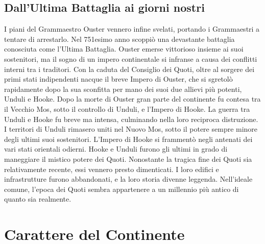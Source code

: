 \documentclass[a4paper]{report}
\begin{document}
\begin{multicols}{2}
\section*{Dall'Ultima Battaglia ai giorni nostri}
I piani del Grammaestro Ouster vennero infine svelati, portando i Grammaestri a tentare di arrestarlo. Nel 751esimo anno scoppiò una devastante battaglia conosciuta come l'Ultima Battaglia. Ouster emerse vittorioso insieme ai suoi sostenitori, ma il sogno di un impero continentale si infranse a causa dei conflitti interni tra i traditori.
Con la caduta del Consiglio dei Quoti, oltre al sorgere dei primi stati indipendenti nacque il breve Impero di Ouster, che si sgretolò rapidamente dopo la sua sconfitta per mano dei suoi due allievi più potenti, Unduli e Hooke. Dopo la morte di Ouster gran parte del continente fu contesa tra il Vecchio Mos, sotto il controllo di Unduli, e l'Impero di Hooke.
La guerra tra Unduli e Hooke fu breve ma intensa, culminando nella loro reciproca distruzione. I territori di Unduli rimasero uniti nel Nuovo Mos, sotto il potere sempre minore degli ultimi suoi sostenitori. L'Impero di Hooke si frammentò negli antenati dei vari stati orientali odierni.
Hooke e Unduli furono gli ultimi in grado di maneggiare il mistico potere dei Quoti.
Nonostante la tragica fine dei Quoti sia relativamente recente, essi vennero presto dimenticati. I loro edifici e infrastrutture furono abbandonati, e la loro storia divenne leggenda. Nell'ideale comune, l'epoca dei Quoti sembra appartenere a un millennio più antico di quanto sia realmente.


\end{multicols}

\chapter{Carattere del Continente}
\end{document}

